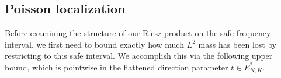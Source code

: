 \documentclass[12pt]{amsart}
\numberwithin{equation}{section}
\begin{document}




\subsection{Poisson localization}\label{subsec:poisson}
Before examining the structure of our Riesz product on the safe frequency interval, we first need to bound exactly how much $L^2$ mass has been lost by restricting to this safe interval. We accomplish this via the following upper bound, which is pointwise in the flattened direction parameter $t \in E_{N,K}^*$.
\end{document}
